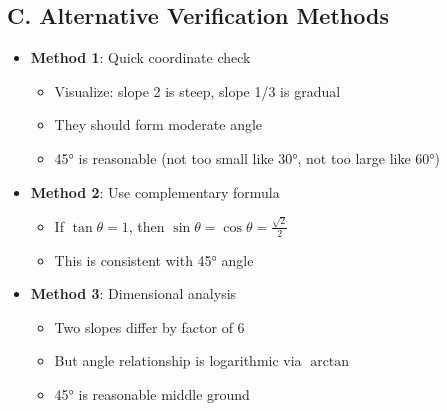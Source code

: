 \documentclass[12pt]{article}
\begin{document}
\begin{verificationbox}
\subsection*{C. Alternative Verification Methods}
\begin{itemize}[leftmargin=*]
    \item \textbf{Method 1}: Quick coordinate check
    \begin{itemize}
        \item Visualize: slope 2 is steep, slope 1/3 is gradual
        \item They should form moderate angle
        \item 45° is reasonable (not too small like 30°, not too large like 60°)
    \end{itemize}
    \item \textbf{Method 2}: Use complementary formula
    \begin{itemize}
        \item If $\tan\theta = 1$, then $\sin\theta = \cos\theta = \frac{\sqrt{2}}{2}$
        \item This is consistent with 45° angle
    \end{itemize}
    \item \textbf{Method 3}: Dimensional analysis
    \begin{itemize}
        \item Two slopes differ by factor of 6
        \item But angle relationship is logarithmic via $\arctan$
        \item 45° is reasonable middle ground
    \end{itemize}
\end{itemize}
\end{verificationbox}
\end{document}
